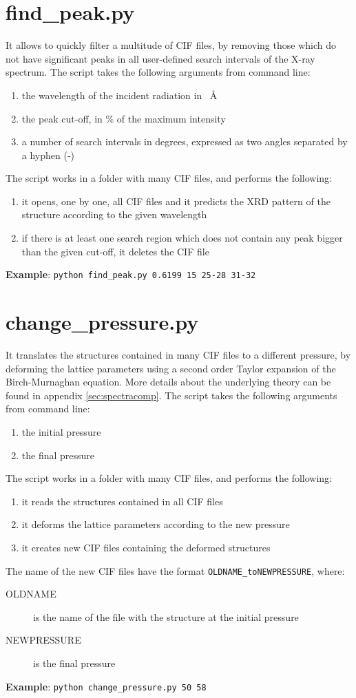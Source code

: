 \documentclass{article}
\begin{document}
\section{find\_peak.py}
It allows to quickly filter a multitude of CIF files, by removing those which do not have significant peaks in all user-defined search intervals of the X-ray spectrum. The script takes the following arguments from command line:
\begin{enumerate}
	\item the wavelength of the incident radiation in \SI{}{\angstrom}
	\item the peak cut-off, in \% of the maximum intensity
	\item a number of search intervals in degrees, expressed as two angles separated by a hyphen (-)
\end{enumerate}
The script works in a folder with many CIF files, and performs the following:
\begin{enumerate}
	\item it opens, one by one, all CIF files and it predicts the XRD pattern of the structure according to the given wavelength
	\item if there is at least one search region which does not contain any peak bigger than the given cut-off, it deletes the CIF file
\end{enumerate}
\textbf{Example}: \texttt{python find\_peak.py 0.6199 15 25-28 31-32}

\section{change\_pressure.py}
It translates the structures contained in many CIF files to a different pressure, by deforming the lattice parameters using a second order Taylor expansion of the Birch-Murnaghan equation. More details about the underlying theory can be found in appendix \ref{sec:spectracomp}. The script takes the following arguments from command line:
\begin{enumerate}
	\item the initial pressure
	\item the final pressure
\end{enumerate}
The script works in a folder with many CIF files, and performs the following:
\begin{enumerate}
	\item it reads the structures contained in all CIF files
	\item it deforms the lattice parameters according to the new pressure
	\item it creates new CIF files containing the deformed structures
\end{enumerate}
The name of the new CIF files have the format \texttt{OLDNAME\_toNEWPRESSURE}, where:
\begin{description}
	\item[OLDNAME] is the name of the file with the structure at the initial pressure
	\item[NEWPRESSURE] is the final pressure
\end{description}
\textbf{Example}: \texttt{python change\_pressure.py 50 58}
\end{document}
